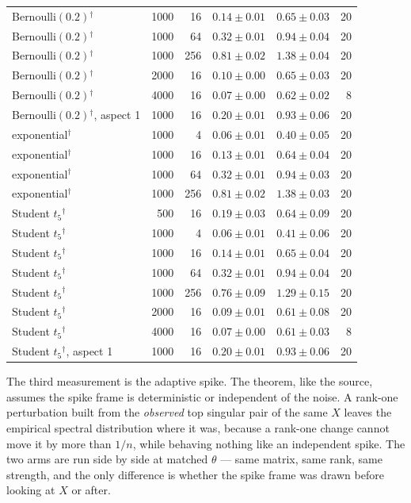 \documentclass[11pt]{article}
\theoremstyle{definition}
\begin{document}
\begin{table}[htbp]
\begin{tabular}{lrrllr}
Bernoulli$(0.2)$$^{\dagger}$ & 1000 & 16 & $0.14\pm0.01$ & $0.65\pm0.03$ & 20\\
Bernoulli$(0.2)$$^{\dagger}$ & 1000 & 64 & $0.32\pm0.01$ & $0.94\pm0.04$ & 20\\
Bernoulli$(0.2)$$^{\dagger}$ & 1000 & 256 & $0.81\pm0.02$ & $1.38\pm0.04$ & 20\\
Bernoulli$(0.2)$$^{\dagger}$ & 2000 & 16 & $0.10\pm0.00$ & $0.65\pm0.03$ & 20\\
Bernoulli$(0.2)$$^{\dagger}$ & 4000 & 16 & $0.07\pm0.00$ & $0.62\pm0.02$ & 8\\
Bernoulli$(0.2)$$^{\dagger}$, aspect 1 & 1000 & 16 & $0.20\pm0.01$ & $0.93\pm0.06$ & 20\\
exponential$^{\dagger}$ & 1000 & 4 & $0.06\pm0.01$ & $0.40\pm0.05$ & 20\\
exponential$^{\dagger}$ & 1000 & 16 & $0.13\pm0.01$ & $0.64\pm0.04$ & 20\\
exponential$^{\dagger}$ & 1000 & 64 & $0.32\pm0.01$ & $0.94\pm0.03$ & 20\\
exponential$^{\dagger}$ & 1000 & 256 & $0.81\pm0.02$ & $1.38\pm0.03$ & 20\\
Student $t_5$$^{\dagger}$ & 500 & 16 & $0.19\pm0.03$ & $0.64\pm0.09$ & 20\\
Student $t_5$$^{\dagger}$ & 1000 & 4 & $0.06\pm0.01$ & $0.41\pm0.06$ & 20\\
Student $t_5$$^{\dagger}$ & 1000 & 16 & $0.14\pm0.01$ & $0.65\pm0.04$ & 20\\
Student $t_5$$^{\dagger}$ & 1000 & 64 & $0.32\pm0.01$ & $0.94\pm0.04$ & 20\\
Student $t_5$$^{\dagger}$ & 1000 & 256 & $0.76\pm0.09$ & $1.29\pm0.15$ & 20\\
Student $t_5$$^{\dagger}$ & 2000 & 16 & $0.09\pm0.01$ & $0.61\pm0.08$ & 20\\
Student $t_5$$^{\dagger}$ & 4000 & 16 & $0.07\pm0.00$ & $0.61\pm0.03$ & 8\\
Student $t_5$$^{\dagger}$, aspect 1 & 1000 & 16 & $0.20\pm0.01$ & $0.93\pm0.06$ & 20\\
\bottomrule
\end{tabular}
\end{table}

The third measurement is the adaptive spike. The theorem, like the source, assumes the spike frame
is deterministic or independent of the noise. A rank-one perturbation built from the \emph{observed}
top singular pair of the same $X$ leaves the empirical spectral distribution where it was, because a
rank-one change cannot move it by more than $1/n$, while behaving nothing like an independent spike.
The two arms are run side by side at matched $\theta$ --- same matrix, same rank, same strength, and
the only difference is whether the spike frame was drawn before looking at $X$ or after.
\end{document}
